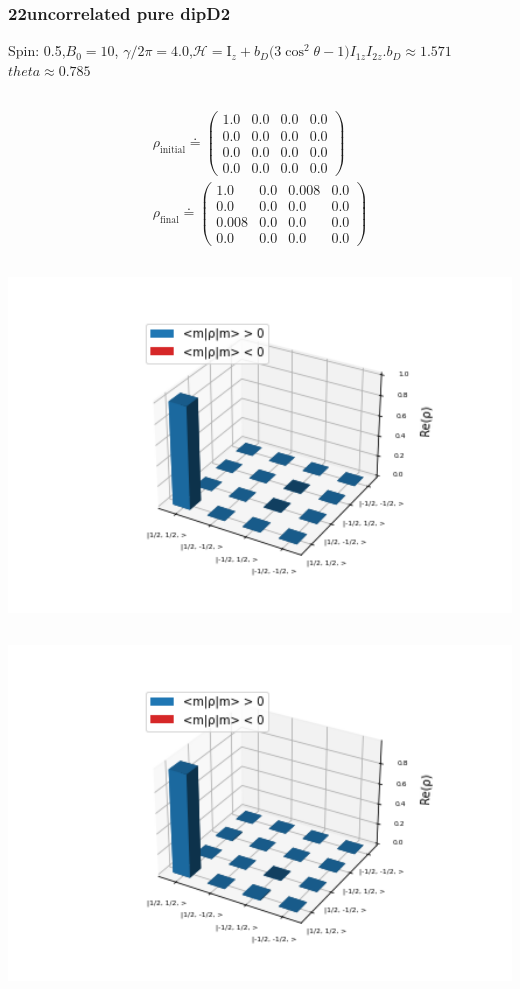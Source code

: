 \documentclass[10pt]{beamer}
\begin{document}
\begin{frame}
\frametitle{22uncorrelated pure dipD2}
Spin: 0.5,$B_0= 10$, $\gamma/2\pi = 4.0$,$\mathcal{H}=\text{I}_{z}+ b_D \big(3\cos^2\theta-1\big)I_{1z}I_{2z}.$$b_D\approx1.571$$theta\approx0.785$
\begin{columns}[T]
\begin{column}{.5\textwidth}
\begin{align*}
\rho_{\text{initial}}\doteq
\begin{pmatrix}
1.0 & 0.0 & 0.0 & 0.0 \\
0.0 & 0.0 & 0.0 & 0.0 \\
0.0 & 0.0 & 0.0 & 0.0 \\
0.0 & 0.0 & 0.0 & 0.0
\end{pmatrix}
\\
\rho_{\text{final}}\doteq
\begin{pmatrix}
1.0 & 0.0 & 0.008 & 0.0 \\
0.0 & 0.0 & 0.0 & 0.0 \\
0.008 & 0.0 & 0.0 & 0.0 \\
0.0 & 0.0 & 0.0 & 0.0
\end{pmatrix}
\end{align*}
\begin{column}{.5\textwidth}
\includegraphics[width=1.5\textwidth]{./spin1-2/22uncorrelated_pure_dipD2/InitialRealPartDensityMatrix.png}
\end{column}
\begin{column}{.5\textwidth}
\includegraphics[width=1.5\textwidth]{./spin1-2/22uncorrelated_pure_dipD2/EvolvedRealPartDensityMatrix.png}

\end{column}
\end{column}
\end{columns}
\end{frame}
\end{document}
